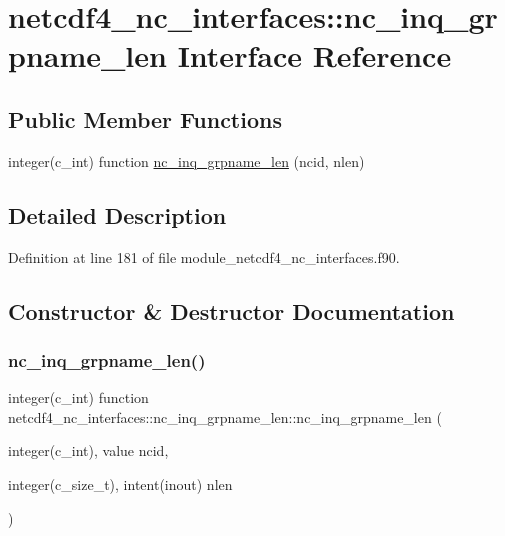 \hypertarget{interfacenetcdf4__nc__interfaces_1_1nc__inq__grpname__len}{}\section{netcdf4\+\_\+nc\+\_\+interfaces\+:\+:nc\+\_\+inq\+\_\+grpname\+\_\+len Interface Reference}
\label{interfacenetcdf4__nc__interfaces_1_1nc__inq__grpname__len}
\subsection*{Public Member Functions}
\begin{DoxyCompactItemize}
\item 
integer(c\+\_\+int) function \hyperlink{interfacenetcdf4__nc__interfaces_1_1nc__inq__grpname__len_ab05216382f771798ee9a89c656f961d8}{nc\+\_\+inq\+\_\+grpname\+\_\+len} (ncid, nlen)
\end{DoxyCompactItemize}


\subsection{Detailed Description}


Definition at line 181 of file module\+\_\+netcdf4\+\_\+nc\+\_\+interfaces.\+f90.



\subsection{Constructor \& Destructor Documentation}
\mbox{\label{interfacenetcdf4__nc__interfaces_1_1nc__inq__grpname__len_ab05216382f771798ee9a89c656f961d8}} 
\subsubsection{\texorpdfstring{nc\+\_\+inq\+\_\+grpname\+\_\+len()}{nc\_inq\_grpname\_len()}}
{\footnotesize\ttfamily integer(c\+\_\+int) function netcdf4\+\_\+nc\+\_\+interfaces\+::nc\+\_\+inq\+\_\+grpname\+\_\+len\+::nc\+\_\+inq\+\_\+grpname\+\_\+len (\begin{DoxyParamCaption}\item[{integer(c\+\_\+int), value}]{ncid,  }\item[{integer(c\+\_\+size\+\_\+t), intent(inout)}]{nlen }\end{DoxyParamCaption})}



